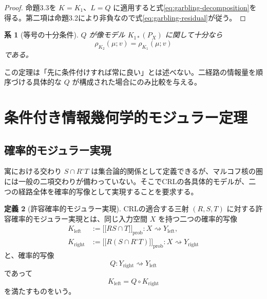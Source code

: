 \documentclass[a4paper,11pt]{ltjsarticle}
\theoremstyle{definition}
\newtheorem{definition}{定義}[section]
\theoremstyle{plain}
\newtheorem{corollary}[definition]{系}
\newcommand{\sem}[1]{\mathopen{[\![}#1\mathclose{]\!]}}
\begin{document}
\begin{proof}
命題3.3を $K=K_1$、$L=Q$ に適用すると式\eqref{eq:garbling-decomposition}を得る。第二項は命題3.2により非負なので式\eqref{eq:garbling-residual}が従う。
\end{proof}

\begin{corollary}[等号の十分条件]
$Q$ が像モデル $K_{1*}(P_X)$ に関して十分なら
\begin{equation}
 \rho_{K_2}(\mu;v)
 =
 \rho_{K_1}(\mu;v)
\end{equation}
である。
\end{corollary}

この定理は「先に条件付けすれば常に良い」とは述べない。二経路の情報量を順序づける具体的な $Q$ が構成された場合にのみ比較を与える。

\section{条件付き情報幾何学的モジュラー定理}

\subsection{確率的モジュラー実現}

寓における交わり $S\cap R^\circ T$ は集合論的関係として定義できるが、マルコフ核の圏には一般の二項交わりが備わっていない。そこでCRLの各具体的モデルが、二つの経路全体を確率的写像として実現することを要求する。

\begin{definition}[許容確率的モジュラー実現]
CRLの適合する三射 $(R,S,T)$ に対する許容確率的モジュラー実現とは、同じ入力空間 $X$ を持つ二つの確率的写像
\begin{align}
 K_{\mathrm{left}}
 &:=\sem{RS\cap T}_{\mathrm{prob}}
 :X\rightsquigarrow Y_{\mathrm{left}},\\
 K_{\mathrm{right}}
 &:=\sem{R(S\cap R^\circ T)}_{\mathrm{prob}}
 :X\rightsquigarrow Y_{\mathrm{right}}
 \label{eq:modular-kernels}
\end{align}
と、確率的写像
\begin{equation}
 Q:Y_{\mathrm{right}}
 \rightsquigarrow Y_{\mathrm{left}}
\end{equation}
であって
\begin{equation}
 K_{\mathrm{left}}
 =Q\circ K_{\mathrm{right}}
 \label{eq:modular-factorization}
\end{equation}
を満たすものをいう。
\end{definition}
\end{document}
